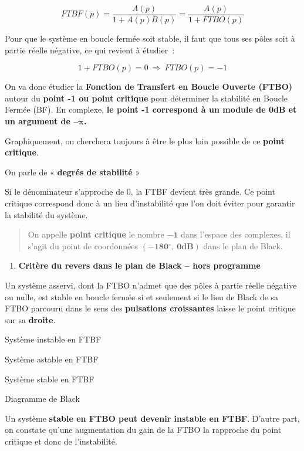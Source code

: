 \[FTBF(p) = \frac{A(p)}{1 + A(p)B(p)} = \frac{A(p)}{1 + FTBO(p)}\]

Pour que le système en boucle fermée soit stable, il faut que tous ses pôles soit à partie réelle négative, ce qui revient à étudier~:

\[1 + FTBO(p) = 0\  \Rightarrow \ FTBO(p) = - 1\]

On va donc étudier la \textbf{Fonction de Transfert en Boucle Ouverte (FTBO)} autour du \textbf{point -1 ou point critique} pour déterminer la stabilité en Boucle Fermée (BF). En complexe, \textbf{le point -1 correspond à un module de 0dB et un argument de --}\(\mathbf{\pi}\)\textbf{.}

Graphiquement, on cherchera toujours à être le plus loin possible de ce \textbf{point critique}.

On parle de « \textbf{degrés de stabilité} »



Si le dénominateur s'approche de 0, la FTBF devient très grande. Ce point critique correspond donc à un lieu d'instabilité que l'on doit éviter pour garantir la stabilité du système.

\begin{quote}
On appelle \textbf{point critique} le nombre \(\mathbf{- 1}\) dans l'espace des complexes, il s'agit du point de coordonnées \(\left( \mathbf{- 180{^\circ},\ 0}\mathbf{dB} \right)\) dans le plan de Black.
\end{quote}

\begin{enumerate}
\def\labelenumi{\arabic{enumi}.}
\item
  \protect\hypertarget{mod-_Toc59134857}{}{}\textbf{Critère du revers dans le plan de Black -- hors programme}
\end{enumerate}

Un système asservi, dont la FTBO n'admet que des pôles à partie réelle négative ou nulle, est stable en boucle fermée si et seulement si le lieu de Black de sa FTBO parcouru dans le sens des \textbf{pulsations croissantes} laisse le point critique sur sa \textbf{droite}.

Système instable en FTBF

Système astable en FTBF

Système stable en FTBF

Diagramme de Black

Un système \textbf{stable en FTBO peut devenir instable en FTBF}. D'autre part, on constate qu'une augmentation du gain de la FTBO la rapproche du point critique et donc de l'instabilité.

